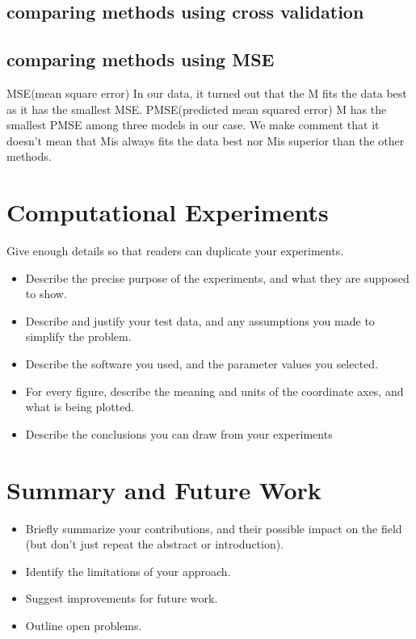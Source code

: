 \documentclass[10pt]{article}
\theoremstyle{plain}
\theoremstyle{definition}
\theoremstyle{remark}
\begin{document}
\subsection{comparing methods using cross validation}



\subsection{comparing methods using MSE}

\justify
MSE(mean square error)
In our data, it turned out that the M fits the data best as it has the smallest MSE. 
PMSE(predicted mean squared error)
M has the smallest PMSE among three models in our case. We make comment that it doesn't mean that Mis always fits the data best nor
Mis superior than the other methods. 





\section{Computational Experiments}
Give enough details so that readers can duplicate your experiments.

\begin{itemize}
	\item Describe the precise purpose of the experiments, and what they 
	are supposed to show.
	
	\item Describe and justify your test data, and any assumptions you made to 
	simplify the problem.
	
	\item Describe the software you used, and the 
	parameter values you selected.
	
	\item 
	For every figure, describe the meaning and units of the coordinate axes, 
	and what is being plotted.
	
	\item Describe the conclusions you can draw from your experiments
\end{itemize}


\section{Summary and Future Work}
\begin{itemize}
	\item Briefly summarize your contributions, and their possible
	impact on the field (but don't just repeat the abstract or introduction).
	\item Identify the limitations of your approach.
	\item Suggest improvements for future work.
	\item Outline open problems.
\end{itemize}



 
%



\end{document}
